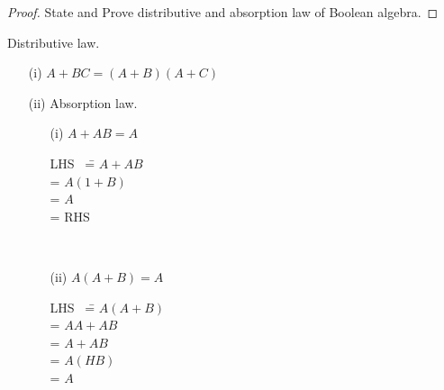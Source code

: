 \begin{proof}
State and Prove distributive and absorption law of Boolean algebra.
\end{proof}

\begin{solution}
Distributive law.
\begin{itemize}
\item[(i)] $A+BC=(A+B)(A+C)$
\begin{itemize}
\end{itemize}

\item[(ii)] Absorption law.

\begin{minipage}[c]{5cm}
\begin{itemize}
\item[(i)] $A+AB=A$
\begin{tabbing}
       LHS~ \== $A+AB$\\
            \>= $A(1+B)$\\
            \>= $A$\\
            \>= RHS\\
\end{tabbing}
\end{itemize}
\end{minipage}
\qquad\quad~
\begin{minipage}[c]{5cm}
\begin{itemize}
\item[(ii)] $A(A+B)=A$
\begin{tabbing}
      LHS~ \== $A(A+B)$\\
           \>= $AA+AB$\\
           \>= $A+AB$\\
           \>= $A(HB)$\\
           \>= $A$
\end{tabbing}
\end{itemize}
\end{minipage}
\end{itemize}
\end{solution}

